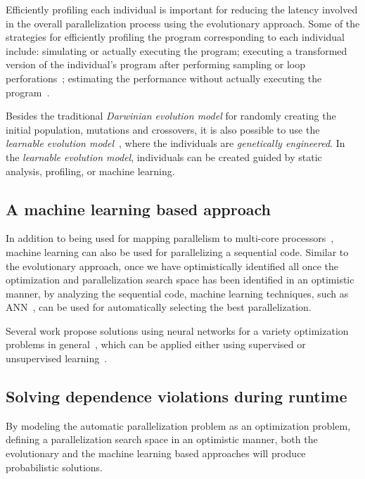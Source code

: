 \documentclass[a4paper,12pt]{article}
\begin{document}
Efficiently profiling each individual is important for reducing the latency
involved in the overall parallelization process using the evolutionary
approach.  Some of the strategies for efficiently profiling the program
corresponding to each individual include: simulating or actually executing the
program; executing a transformed version of the individual's program after
performing sampling or loop perforations~\cite{douskos11,misailovic11,zhu12};
estimating the performance without actually executing the
program~\cite{fahringer95b,fahringer00,fahringer11}.

Besides the traditional {\em Darwinian evolution model} for randomly creating
the initial population, mutations and crossovers, it is also possible to use
the {\em learnable evolution model}~\cite{michalski00,cervone00}, where the
individuals are {\em genetically engineered}. In the {\em learnable evolution
model}, individuals can be created guided by static analysis, profiling, or
machine learning.

\subsection{A machine learning based approach}

In addition to being used for mapping parallelism to multi-core
processors~\cite{wang09,tournavitis09,wang14a}, machine learning can also be
used for parallelizing a sequential code.  Similar to the evolutionary
approach, once we have optimistically identified all once the optimization and
parallelization search space has been identified in an optimistic manner, by
analyzing the sequential code, machine learning techniques, such as
ANN~\cite{ohlsson93,wang99}, can be used for automatically selecting the best
parallelization.

Several work propose solutions using neural networks for a variety optimization
problems in general~\cite{ohlsson93,wang99,smith99}, which can be applied
either using supervised or unsupervised
learning~\cite{bengio07}.

\subsection{Solving dependence violations during runtime}

By modeling the automatic parallelization problem as an optimization problem,
defining a parallelization search space in an optimistic manner, both the
evolutionary and the machine learning based approaches will produce
probabilistic solutions.
\end{document}
